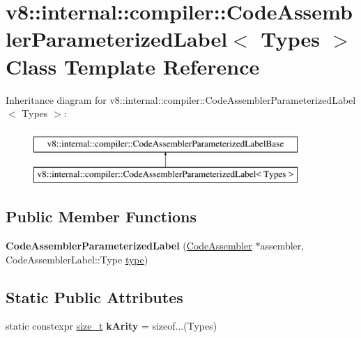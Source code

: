 \hypertarget{classv8_1_1internal_1_1compiler_1_1CodeAssemblerParameterizedLabel}{}\section{v8\+:\+:internal\+:\+:compiler\+:\+:Code\+Assembler\+Parameterized\+Label$<$ Types $>$ Class Template Reference}
\label{classv8_1_1internal_1_1compiler_1_1CodeAssemblerParameterizedLabel}
Inheritance diagram for v8\+:\+:internal\+:\+:compiler\+:\+:Code\+Assembler\+Parameterized\+Label$<$ Types $>$\+:\begin{figure}[H]
\begin{center}
\leavevmode
\includegraphics[height=2.000000cm]{classv8_1_1internal_1_1compiler_1_1CodeAssemblerParameterizedLabel}
\end{center}
\end{figure}
\subsection*{Public Member Functions}
\begin{DoxyCompactItemize}
\item 
\mbox{\label{classv8_1_1internal_1_1compiler_1_1CodeAssemblerParameterizedLabel_a193abab9ecff52071909ef08d92d7a9a}} 
{\bfseries Code\+Assembler\+Parameterized\+Label} (\mbox{\hyperlink{classv8_1_1internal_1_1compiler_1_1CodeAssembler}{Code\+Assembler}} $\ast$assembler, Code\+Assembler\+Label\+::\+Type \mbox{\hyperlink{classstd_1_1conditional_1_1type}{type}})
\end{DoxyCompactItemize}
\subsection*{Static Public Attributes}
\begin{DoxyCompactItemize}
\item 
\mbox{\label{classv8_1_1internal_1_1compiler_1_1CodeAssemblerParameterizedLabel_ae6da64f14d52d47b517b51872b2548e8}} 
static constexpr \mbox{\hyperlink{classsize__t}{size\+\_\+t}} {\bfseries k\+Arity} = sizeof...(Types)
\end{DoxyCompactItemize}
